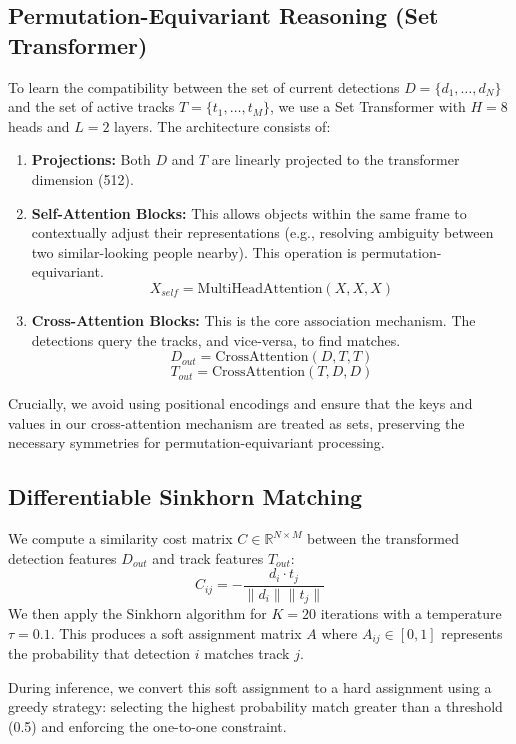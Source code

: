 \documentclass{article}
\begin{document}
\subsection{Permutation-Equivariant Reasoning (Set Transformer)}

To learn the compatibility between the set of current detections $D = \{d_1, \dots, d_N\}$ and the set of active tracks $T = \{t_1, \dots, t_M\}$, we use a Set Transformer with $H=8$ heads and $L=2$ layers. The architecture consists of:
\begin{enumerate}
  \item \textbf{Projections:} Both $D$ and $T$ are linearly projected to the transformer dimension (512).
  \item \textbf{Self-Attention Blocks:} This allows objects within the same frame to contextually adjust their representations (e.g., resolving ambiguity between two similar-looking people nearby). This operation is permutation-equivariant.
  $$X_{self} = \text{MultiHeadAttention}(X, X, X)$$
  \item \textbf{Cross-Attention Blocks:} This is the core association mechanism. The detections query the tracks, and vice-versa, to find matches.
  $$D_{out} = \text{CrossAttention}(D, T, T)$$
  $$T_{out} = \text{CrossAttention}(T, D, D)$$
\end{enumerate}

Crucially, we avoid using positional encodings and ensure that the keys and values in our cross-attention mechanism are treated as sets, preserving the necessary symmetries for permutation-equivariant processing.

\subsection{Differentiable Sinkhorn Matching}

We compute a similarity cost matrix $C \in \mathbb{R}^{N \times M}$ between the transformed detection features $D_{out}$ and track features $T_{out}$:
$$C_{ij} = - \frac{d_i \cdot t_j}{\|d_i\| \|t_j\|}$$
We then apply the Sinkhorn algorithm for $K=20$ iterations with a temperature $\tau=0.1$. This produces a soft assignment matrix $A$ where $A_{ij} \in [0, 1]$ represents the probability that detection $i$ matches track $j$.

During inference, we convert this soft assignment to a hard assignment using a greedy strategy: selecting the highest probability match greater than a threshold (0.5) and enforcing the one-to-one constraint.
\end{document}
